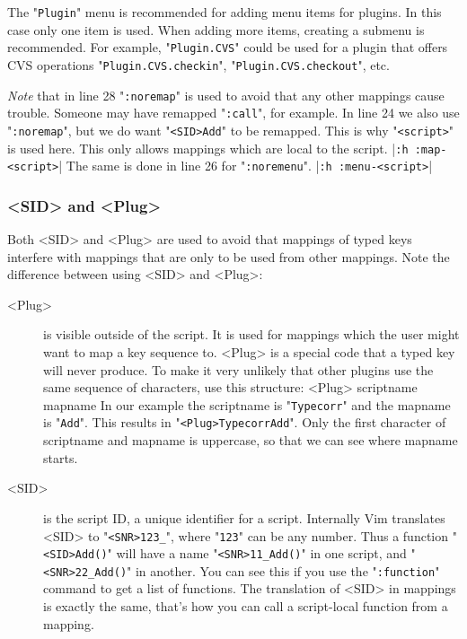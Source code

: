 The "\texttt{Plugin}" menu is recommended for adding menu items for plugins.
In this case only one item is used.
When adding more items, creating a submenu is recommended.
For example, "\texttt{Plugin.CVS}" could be used for a plugin that offers CVS operations "\texttt{Plugin.CVS.checkin}", "\texttt{Plugin.CVS.checkout}", etc.

\emph{Note} that in line 28 "\texttt{:noremap}" is used to avoid that any other mappings cause trouble.
Someone may have remapped "\texttt{:call}", for example.
In line 24 we also use "\texttt{:noremap}", but we do want "\texttt{<SID>Add}" to be remapped.
This is why "\texttt{<script>}" is used here.
This only allows mappings which are local to the script. |\texttt{:h :map-<script>}|
The same is done in line 26 for "\texttt{:noremenu}".
|\texttt{:h :menu-<script>}|

\subsubsection{<SID> and <Plug>}
\label{using-<Plug>}
Both <SID> and <Plug> are used to avoid that mappings of typed keys interfere with mappings that are only to be used from other mappings.
Note the difference between using <SID> and <Plug>:

\begin{description}
				\item [<Plug>]    is visible outside of the script.
								It is used for mappings which the user might want to map a key sequence to.
								<Plug> is a special code that a typed key will never produce.
								To make it very unlikely that other plugins use the same sequence of characters, use this structure: <Plug> scriptname mapname In our example the scriptname is "\texttt{Typecorr}" and the mapname is "\texttt{Add}".
								This results in "\texttt{<Plug>TypecorrAdd}".
								Only the first character of scriptname and mapname is uppercase, so that we can see where mapname starts.

				\item [<SID>]  is the script ID, a unique identifier for a script.
								Internally Vim translates <SID> to "\texttt{<SNR>123\_}", where "\texttt{123}" can be any number.
								Thus a function "\texttt{<SID>Add()}" will have a name "\texttt{<SNR>11\_Add()}" in one script, and "\texttt{<SNR>22\_Add()}" in another.
								You can see this if you use the "\texttt{:function}" command to get a list of functions.
								The translation of <SID> in mappings is exactly the same, that's how you can call a script-local function from a mapping.
\end{description}


